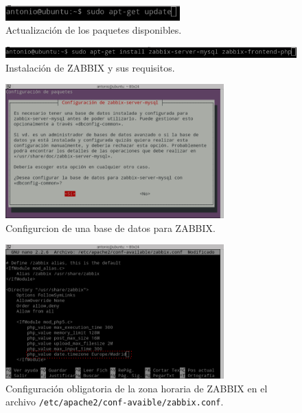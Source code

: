 \begin{figure}[H]
  \begin{center}
    \includegraphics[width=0.6\textwidth]{imagenes/zab3}
    \caption{Actualización de los paquetes disponibles.}
    \label{fig32}
  \end{center}
\end{figure}

\begin{figure}[H]
  \begin{center}
    \includegraphics[width=1\textwidth]{imagenes/zab4}
    \caption{Instalación de ZABBIX y sus requisitos.}
    \label{fig33}
  \end{center}
\end{figure}

\begin{figure}[H]
  \begin{center}
    \includegraphics[width=0.75\textwidth]{imagenes/zab5}
    \caption{Configurcion de una base de datos para ZABBIX.}
    \label{fig34}
  \end{center}
\end{figure}

\begin{figure}[H]
  \begin{center}
    \includegraphics[width=0.75\textwidth]{imagenes/zab6}
    \caption{Configuración obligatoria de la zona horaria de ZABBIX en el archivo \texttt{/etc/apache2/conf-avaible/zabbix.conf}.}
    \label{fig35}
  \end{center}
\end{figure}


